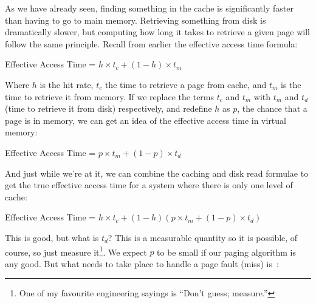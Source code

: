 As we have already seen, finding something in the cache is significantly faster than having to go to main memory. Retrieving something from disk is dramatically slower, but computing how long it takes to retrieve a given page will follow the same principle. Recall from earlier the effective access time formula:

\begin{center}
	Effective Access Time = $ h \times t_{c} + (1 - h) \times t_{m}$
\end{center}

Where $h$ is the hit rate, $t_{c}$ the time to retrieve a page from cache, and $t_{m}$ is the time to retrieve it from memory. If we replace the terms $t_{c}$ and $t_{m}$ with $t_{m}$ and $t_{d}$ (time to retrieve it from disk) respectively, and redefine $h$ as $p$, the chance that a page is in memory, we can get an idea of the effective access time in virtual memory: 

\begin{center}
	Effective Access Time = $ p \times t_{m} + (1 - p) \times t_{d}$
\end{center}

And just while we're at it, we can combine the caching and disk read formulae to get the true effective access time for a system where there is only one level of cache:

\begin{center}
	Effective Access Time = $ h \times t_{c} + (1 - h) ( p \times t_{m} + (1 - p) \times t_{d})$
\end{center}

This is good, but what is $t_{d}$? This is a measurable quantity so it is possible, of course, so just measure it\footnote{One of my favourite engineering sayings is ``Don't guess; measure.''}. We expect $p$ to be small if our paging algorithm is any good. But what needs to take place to handle a page fault (miss) is~\cite{osc}:

